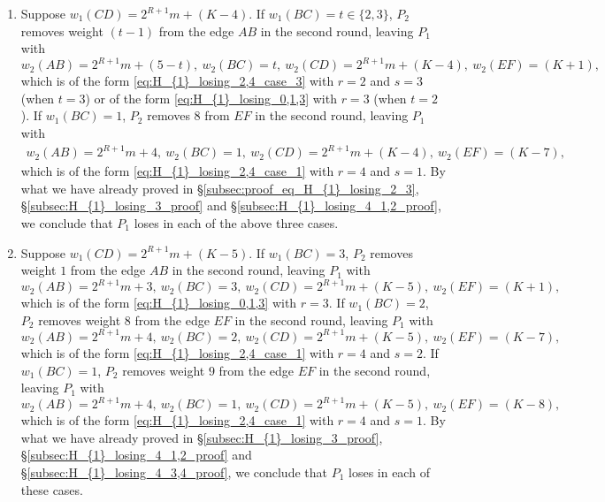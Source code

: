 \documentclass[11pt,reqno]{amsart}
\theoremstyle{definition}
\theoremstyle{definition}
\begin{document}
\begin{enumerate}
\begin{enumerate}
\item Suppose $w_{1}(CD)=2^{R+1}m+(K-4)$. If $w_{1}(BC)=t \in \{2,3\}$, $P_{2}$ removes weight $(t-1)$ from the edge $AB$ in the second round, leaving $P_{1}$ with
\begin{equation}
w_{2}(AB)=2^{R+1}m+(5-t),\ w_{2}(BC)=t,\ w_{2}(CD)=2^{R+1}m+(K-4),\ w_{2}(EF)=(K+1),\nonumber
\end{equation}
which is of the form \eqref{eq:H_{1}_losing_2,4_case_3} with $r=2$ and $s=3$ (when $t=3$) or of the form \eqref{eq:H_{1}_losing_0,1,3} with $r=3$ (when $t=2$). If $w_{1}(BC)=1$, $P_{2}$ removes $8$ from $EF$ in the second round, leaving $P_{1}$ with
\begin{align}
w_{2}(AB)=2^{R+1}m+4,\ w_{2}(BC)=1,\ w_{2}(CD)=2^{R+1}m+(K-4),\ w_{2}(EF)=(K-7),\nonumber
\end{align}
which is of the form \eqref{eq:H_{1}_losing_2,4_case_1} with $r=4$ and $s=1$. By what we have already proved in \S\ref{subsec:proof_eq_H_{1}_losing_2_3}, \S\ref{subsec:H_{1}_losing_3_proof} and \S\ref{subsec:H_{1}_losing_4_1,2_proof}, we conclude that $P_{1}$ loses in each of the above three cases.

\item Suppose $w_{1}(CD)=2^{R+1}m+(K-5)$. If $w_{1}(BC)=3$, $P_{2}$ removes weight $1$ from the edge $AB$ in the second round, leaving $P_{1}$ with
\begin{equation}
w_{2}(AB)=2^{R+1}m+3,\ w_{2}(BC)=3,\ w_{2}(CD)=2^{R+1}m+(K-5),\ w_{2}(EF)=(K+1),\nonumber
\end{equation}
which is of the form \eqref{eq:H_{1}_losing_0,1,3} with $r=3$. If $w_{1}(BC)=2$, $P_{2}$ removes weight $8$ from the edge $EF$ in the second round, leaving $P_{1}$ with
\begin{equation}
w_{2}(AB)=2^{R+1}m+4,\ w_{2}(BC)=2,\ w_{2}(CD)=2^{R+1}m+(K-5),\ w_{2}(EF)=(K-7),\nonumber
\end{equation}
which is of the form \eqref{eq:H_{1}_losing_2,4_case_1} with $r=4$ and $s=2$. If $w_{1}(BC)=1$, $P_{2}$ removes weight $9$ from the edge $EF$ in the second round, leaving $P_{1}$ with
\begin{equation}
w_{2}(AB)=2^{R+1}m+4,\ w_{2}(BC)=1,\ w_{2}(CD)=2^{R+1}m+(K-5),\ w_{2}(EF)=(K-8),\nonumber
\end{equation}
which is of the form \eqref{eq:H_{1}_losing_2,4_case_1} with $r=4$ and $s=1$. By what we have already proved in \S\ref{subsec:H_{1}_losing_3_proof}, \S\ref{subsec:H_{1}_losing_4_1,2_proof} and \S\ref{subsec:H_{1}_losing_4_3,4_proof}, we conclude that $P_{1}$ loses in each of these cases. 


\end{enumerate}
\end{enumerate}
\end{document}
